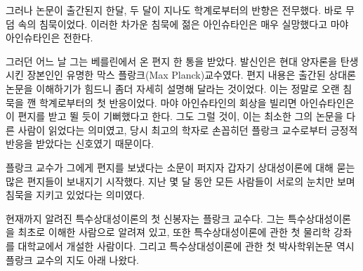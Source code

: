   그러나 논문이 출간된지 한달, 두 달이 지나도 학계로부터의 반향은 전무했다. 바로 무덤 속의
침묵이었다. 이러한 차가운 침묵에 젊은 아인슈타인은 매우 실망했다고 마야 아인슈타인은
전한다.

  그러던 어느 날 그는 베를린에서 온 편지 한 통을 받았다. 발신인은 현대 양자론을 탄생시킨
장본인인 유명한 막스 플랑크(Max Planck)교수였다. 편지 내용은 출간된 상대론 논문을
이해하기가 힘드니 좀더 자세히 설명해 달라는 것이었다. 이는 정말로 오랜 침묵을 깬
학계로부터의 첫 반응이었다. 마야 아인슈타인의 회상을 빌리면 아인슈타인은 이 편지를 받고
뛸 듯이 기뻐했다고 한다. 그도 그럴 것이, 이는 최소한 그의 논문을 다른 사람이 읽었다는
의미였고, 당시 최고의 학자로 손꼽히던 플랑크 교수로부터 긍정적 반응을 받았다는 신호였기
때문이다.

  플랑크 교수가 그에게 편지를 보냈다는 소문이 퍼지자 갑자기 상대성이론에 대해 묻는 많은
편지들이 보내지기 시작했다. 지난 몇 달 동안 모든 사람들이 서로의 눈치만 보며 침묵을 지키고
있었다는 의미였다.

  현재까지 알려진 특수상대성이론의 첫 신봉자는 플랑크 교수다. 그는 특수상대성이론을 최초로
이해한 사람으로 알려져 있고, 또한 특수상대성이론에 관한 첫 물리학 강좌를 대학교에서 개설한
사람이다. 그리고 특수상대성이론에 관한 첫 박사학위논문 역시 플랑크 교수의 지도 아래
나왔다.

\bye
